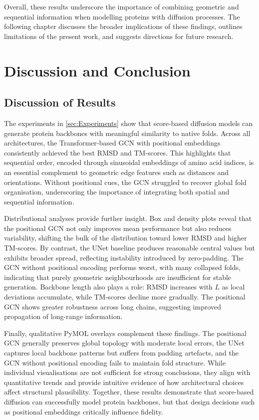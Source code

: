 \documentclass[a4paper,12pt]{article}
\begin{document}
Overall, these results underscore the importance of combining geometric and sequential information when modelling proteins with diffusion processes. The following chapter discusses the broader implications of these findings, outlines limitations of the present work, and suggests directions for future research.

\clearpage

\section{Discussion and Conclusion}\label{sec:Discussion_and_Conclusion}
\subsection{Discussion of Results}\label{subsec:discussion-results}
The experiments in \cref{sec:Experiments} show that score-based diffusion models can generate protein backbones with meaningful similarity to native folds. Across all architectures, the Transformer-based GCN with positional embeddings consistently achieved the best RMSD and TM-scores. This highlights that sequential order, encoded through sinusoidal embeddings of amino acid indices, is an essential complement to geometric edge features such as distances and orientations. Without positional cues, the GCN struggled to recover global fold organisation, underscoring the importance of integrating both spatial and sequential information.

Distributional analyses provide further insight. Box and density plots reveal that the positional GCN not only improves mean performance but also reduces variability, shifting the bulk of the distribution toward lower RMSD and higher TM-scores. By contrast, the UNet baseline produces reasonable central values but exhibits broader spread, reflecting instability introduced by zero-padding. The GCN without positional encoding performs worst, with many collapsed folds, indicating that purely geometric neighbourhoods are insufficient for stable generation. Backbone length also plays a role: RMSD increases with \(L\) as local deviations accumulate, while TM-scores decline more gradually. The positional GCN shows greater robustness across long chains, suggesting improved propagation of long-range information.

Finally, qualitative PyMOL overlays complement these findings. The positional GCN generally preserves global topology with moderate local errors, the UNet captures local backbone patterns but suffers from padding artefacts, and the GCN without positional encoding fails to maintain fold structure. While individual visualisations are not sufficient for strong conclusions, they align with quantitative trends and provide intuitive evidence of how architectural choices affect structural plausibility. Together, these results demonstrate that score-based diffusion can successfully model protein backbones, but that design decisions such as positional embeddings critically influence fidelity.
\end{document}
